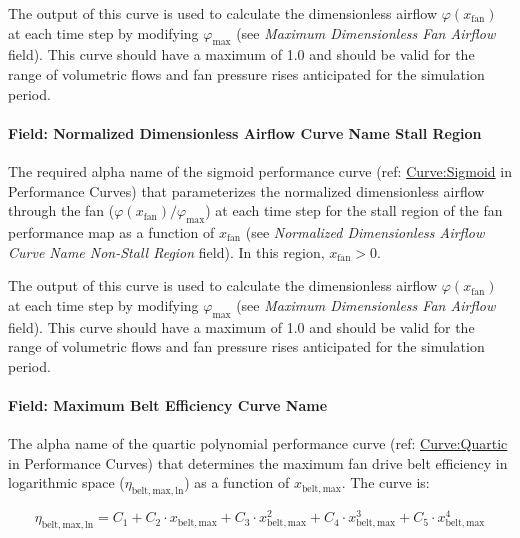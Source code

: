 The output of this curve is used to calculate the dimensionless airflow \(\varphi (x_{\mathrm{fan}})\) at each time step by modifying \(\varphi_{\mathrm{max}}\) (see \emph{Maximum Dimensionless Fan Airflow} field). This curve should have a maximum of 1.0 and should be valid for the range of volumetric flows and fan pressure rises anticipated for the simulation period.

\paragraph{Field: Normalized Dimensionless Airflow Curve Name Stall Region}\label{field-normalized-dimensionless-airflow-curve-name-stall-region}

The required alpha name of the sigmoid performance curve (ref: \hyperref[curvesigmoid]{Curve:Sigmoid} in Performance Curves) that parameterizes the normalized dimensionless airflow through the fan (\(\varphi (x_{\mathrm{fan}}) / \varphi_{\mathrm{max}}\)) at each time step for the stall region of the fan performance map as a function of \(x_{\mathrm{fan}}\) (see \emph{Normalized Dimensionless Airflow Curve Name Non-Stall Region} field). In this region, \(x_{\mathrm{fan}} > 0\).

The output of this curve is used to calculate the dimensionless airflow \(\varphi (x_{\mathrm{fan}})\) at each time step by modifying \(\varphi_{\mathrm{max}}\) (see \emph{Maximum Dimensionless Fan Airflow} field). This curve should have a maximum of 1.0 and should be valid for the range of volumetric flows and fan pressure rises anticipated for the simulation period.

\paragraph{Field: Maximum Belt Efficiency Curve Name}\label{field-maximum-belt-efficiency-curve-name}

The alpha name of the quartic polynomial performance curve (ref: \hyperref[curvequartic]{Curve:Quartic} in Performance Curves) that determines the maximum fan drive belt efficiency in logarithmic space (\(\eta_{\mathrm{belt, max, ln}}\)) as a function of \(x_{\mathrm{belt, max}}\). The curve is:

\begin{equation}
\eta_{\mathrm{belt, max, ln}} = C_1 + C_2 \cdot x_{\mathrm{belt, max}} + C_3 \cdot x_{\mathrm{belt, max}}^2 + C_4 \cdot x_{\mathrm{belt, max}}^3 + C_5 \cdot x_{\mathrm{belt, max}}^4
\end{equation}

